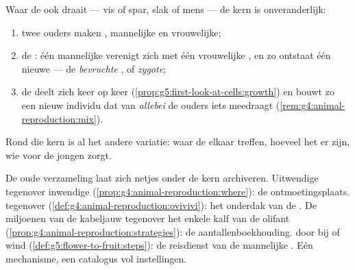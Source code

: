 \begin{proposition}\label{prop:g8:sexual-reproduction:core}
Waar de  ook draait --- vis of spar, slak of
mens --- de kern is onveranderlijk:
\begin{enumerate}
  \item twee ouders maken , mannelijke en vrouwelijke;
  \item de \emph{}: één mannelijke  verenigt zich met
        één vrouwelijke , en zo ontstaat één nieuwe  --- de
        \emph{bevruchte }, of \emph{zygote};
  \item de  deelt zich keer op keer
        (\cref{prop:g5:first-look-at-cells:growth}) en bouwt zo een nieuw
        individu dat van \emph{allebei} de ouders iets meedraagt
        (\cref{rem:g4:animal-reproduction:mix}).
\end{enumerate}
Rond die kern is al het andere variatie: waar de  elkaar treffen,
hoeveel het er zijn, wie voor de jongen zorgt.
\end{proposition}
\admitted

\begin{example}\label{ex:g8:sexual-reproduction:variations}
De oude verzameling laat zich netjes onder de kern archiveren. Uitwendige
tegenover inwendige 
(\cref{prop:g4:animal-reproduction:where}): de ontmoetingsplaats.
 tegenover 
(\cref{def:g4:animal-reproduction:ovivivi}): het onderdak van de .
De miljoenen van de kabeljauw tegenover het enkele kalf van de olifant
(\cref{prop:g4:animal-reproduction:strategies}): de aantallenboekhouding.
 door bij of wind
(\cref{def:g5:flower-to-fruit:steps}): de reisdienst van de mannelijke
. Eén mechanisme, een catalogus vol instellingen.
\end{example}

